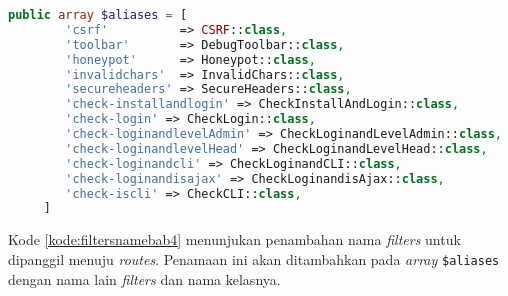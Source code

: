\begin{lstlisting}[language=PHP, caption=Penambahan nama \textit{filters} untuk didefinisikan menuju \textit{routes}, label=kode:filtersnamebab4]
	public array $aliases = [
        'csrf'          => CSRF::class,
        'toolbar'       => DebugToolbar::class,
        'honeypot'      => Honeypot::class,
        'invalidchars'  => InvalidChars::class,
        'secureheaders' => SecureHeaders::class,
        'check-installandlogin' => CheckInstallAndLogin::class,
        'check-login' => CheckLogin::class,
        'check-loginandlevelAdmin' => CheckLoginandLevelAdmin::class,
        'check-loginandlevelHead' => CheckLoginandLevelHead::class,
        'check-loginandcli' => CheckLoginandCLI::class,
        'check-loginandisajax' => CheckLoginandisAjax::class,
        'check-iscli' => CheckCLI::class,
     ]
\end{lstlisting}

Kode \ref{kode:filtersnamebab4} menunjukan penambahan nama \textit{filters} untuk dipanggil menuju \textit{routes}. Penamaan ini akan ditambahkan pada \textit{array} \verb|$aliases| dengan nama lain \textit{filters} dan nama kelasnya.
